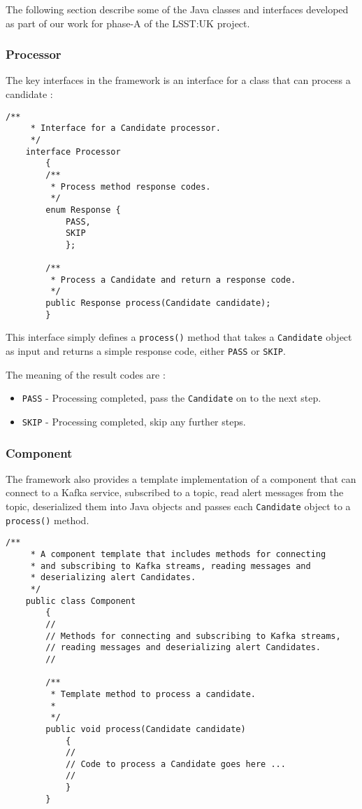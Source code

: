 \documentclass{article}
\newcommand{\phasea} {phase-A\xspace}
\newcommand{\lsstuk} {LSST:UK\xspace}
\begin{document}
The following section describe some of the Java classes and interfaces developed as part of our work for \phasea of the \lsstuk project. 

\subsubsection{Processor}
\label{java-interfaces.Processor}

The key interfaces in the framework is an interface for a class that can process a candidate :

\begin{lstlisting}[style=Java]
    /**
     * Interface for a Candidate processor.
     */
    interface Processor
        {
        /**
         * Process method response codes.
         */
        enum Response {
            PASS,
            SKIP
            };

        /**
         * Process a Candidate and return a response code.
         */
        public Response process(Candidate candidate);
        }
\end{lstlisting}

This interface simply defines a \texttt{process()} method that takes a \texttt{Candidate} object as input and
returns a simple response code, either \texttt{PASS} or \texttt{SKIP}.

The meaning of the result codes are :
\begin{itemize}
  \item \texttt{PASS} - Processing completed, pass the \texttt{Candidate} on to the next step.
  \item \texttt{SKIP} - Processing completed, skip any further steps.
\end{itemize}

\subsubsection{Component}
\label{java-interfaces.Component}

The framework also provides a template implementation of a component that can connect to a Kafka service, subscribed to a topic, read alert messages from the topic, deserialized them into Java objects and passes each \texttt{Candidate} object to a \texttt{process()} method.

\begin{lstlisting}[style=Java]
    /**
     * A component template that includes methods for connecting
     * and subscribing to Kafka streams, reading messages and
     * deserializing alert Candidates.
     */
    public class Component
        {
        //
        // Methods for connecting and subscribing to Kafka streams,
        // reading messages and deserializing alert Candidates.
        //

        /**
         * Template method to process a candidate.
         *
         */
        public void process(Candidate candidate)
            {
            //
            // Code to process a Candidate goes here ...
            //
            }
        }
\end{lstlisting}
\end{document}
